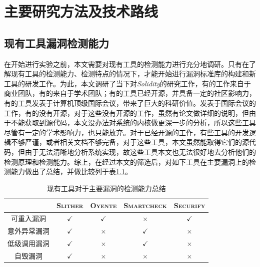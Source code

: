 
\chapter{主要研究方法及技术路线}

\section{现有工具漏洞检测能力}

在开始进行实验之前，本文需要对现有工具的检测能力进行充分地调研。只有在了解现有工具的检测能力、检测特点的情况下，才能开始进行漏洞标准库的构建和新工具的研发工作。为此，本文调研了当下对\emph{Solidity}的研究工作，有的工作来自于商业团队，有的来自于学术团队；有的工具已经开源，并具备一定的社区影响力，有的工具发表于计算机顶级国际会议，带来了巨大的科研价值。发表于国际会议的工作，有的没有开源，对于这些没有开源的工作，虽然有论文做详细的说明，但由于不能获取到源代码，本文没办法对系统的内核做更深一步的分析，所以这些工具尽管有一定的学术影响力，也只能放弃。对于已经开源的工作，有些工具的开发逻辑不够严谨，或者相关文档不够完备，对于这些工具，本文虽然能取得它们的源代码，但由于无法清晰地分析系统实现，故这些工具本文也无法很好地去分析他们的检测原理和检测能力。综上，在经过本文的筛选后，对如下工具在主要漏洞上的检测能力做出了总结，并做比较列于表\ref{tab:detection_capability}。

\begin{table}
  \centering\small
  \caption{现有工具对于主要漏洞的检测能力总结}
  \begin{tabular}{ccccc}
    \toprule
     & \textsc{Slither} & \textsc{Oyente} & \textsc{Smartcheck} & \textsc{Securify} \\
     \midrule
    可重入漏洞 & $\checkmark$ & $\checkmark$ & $\times$ & $\checkmark$  \\
    意外异常漏洞 & $\checkmark$ & $\times$ & $\checkmark$ & $\times$  \\
    低级调用漏洞 & $\checkmark$ & $\times$ & $\checkmark$ & $\times$  \\
    自毁漏洞 & $\checkmark$ & $\times$ & $\times$ & $\times$  \\
    \bottomrule
  \end{tabular}
  \label{tab:detection_capability}
\end{table}


